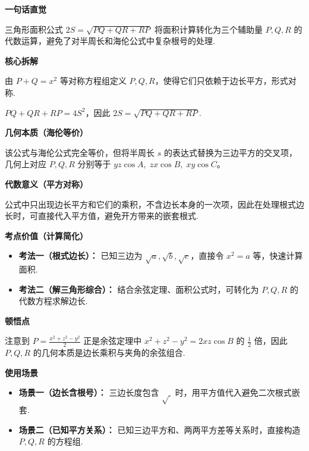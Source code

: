 \begin{explanationbox}

\textbf{\textcolor{CExplanation}{一句话直觉}}

三角形面积公式 $2S=\sqrt{PQ+QR+RP}$ 将面积计算转化为三个辅助量 $P,Q,R$ 的代数运算，避免了对半周长和海伦公式中复杂根号的处理.

\medskip
\textbf{\textcolor{CExplanation}{核心拆解}}
\begin{description}[style=nextline, leftmargin=2.8em, labelsep=0.5em, itemsep=0.45em]
    \item[\textbf{要点一（对称构造）：}] 由 $P+Q=x^2$ 等对称方程组定义 $P,Q,R$，使得它们只依赖于边长平方，形式对称.
    \item[\textbf{要点二（代数关系）：}] $PQ+QR+RP = 4S^2$，因此 $2S = \sqrt{PQ+QR+RP}$.
\end{description}

\medskip
\textbf{\textcolor{CExplanation}{几何本质（海伦等价）}}

该公式与海伦公式完全等价，但将半周长 $s$ 的表达式替换为三边平方的交叉项，几何上对应 $P,Q,R$ 分别等于 $yz\cos A,\;zx\cos B,\;xy\cos C$。

\medskip
\textbf{\textcolor{CExplanation}{代数意义（平方对称）}}

公式中只出现边长平方和它们的乘积，不含边长本身的一次项，因此在处理根式边长时，可直接代入平方值，避免开方带来的嵌套根式.

\medskip
\textbf{\textcolor{CExplanation}{考点价值（计算简化）}}
\begin{itemize}[leftmargin=*, itemsep=0.5em, topsep=0.4em]
    \item \textbf{考法一（根式边长）：} 已知三边为 $\sqrt{a},\sqrt{b},\sqrt{c}$，直接令 $x^2=a$ 等，快速计算面积.
    \item \textbf{考法二（解三角形综合）：} 结合余弦定理、面积公式时，可转化为 $P,Q,R$ 的代数方程求解边长.
\end{itemize}

\medskip
\textbf{\textcolor{CExplanation}{顿悟点}}

注意到 $P = \frac{x^2+z^2-y^2}{2}$ 正是余弦定理中 $x^2+z^2-y^2 = 2xz\cos B$ 的 $\frac12$ 倍，因此 $P,Q,R$ 的几何本质是边长乘积与夹角的余弦组合.

\medskip
\textbf{\textcolor{CExplanation}{使用场景}}
\begin{itemize}[leftmargin=*, itemsep=0.5em, topsep=0.4em]
    \item \textbf{场景一（边长含根号）：} 三边长度包含 $\sqrt{\ }$ 时，用平方值代入避免二次根式嵌套.
    \item \textbf{场景二（已知平方关系）：} 已知三边平方和、两两平方差等关系时，直接构造 $P,Q,R$ 的方程组.
\end{itemize}

\end{explanationbox}
